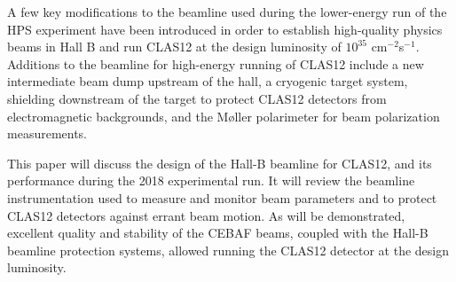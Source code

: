 A few key modifications to the beamline used during the lower-energy run of the HPS experiment \cite{HPSBeamline} have been introduced 
in order to establish high-quality physics beams in Hall B and run CLAS12 at the design luminosity of $10^{35}$ cm$^{-2}$s$^{-1}$.  
Additions to the beamline for high-energy running of CLAS12 include a new intermediate beam dump upstream of the hall, a cryogenic 
target system, shielding downstream of the target to protect CLAS12 detectors from electromagnetic backgrounds, and the M{\o}ller 
polarimeter for beam polarization measurements.   


 
This paper will discuss the design of the Hall-B beamline for CLAS12, and its performance during the 2018 experimental run. It will review the 
beamline instrumentation used to measure and monitor beam parameters and to protect CLAS12 detectors against errant beam motion. As will 
be demonstrated, excellent quality and stability of the CEBAF beams, coupled with the Hall-B beamline protection systems, allowed running the 
CLAS12 detector at the design luminosity.


